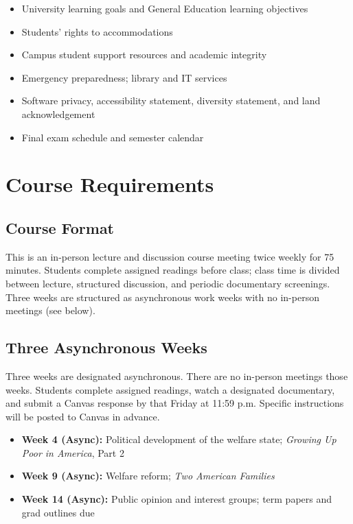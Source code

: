 \documentclass[12pt]{article}
\begin{document}
\begin{itemize}
\item University learning goals and General Education learning objectives
\item Students' rights to accommodations
\item Campus student support resources and academic integrity
\item Emergency preparedness; library and IT services
\item Software privacy, accessibility statement, diversity statement, and land acknowledgement
\item Final exam schedule and semester calendar
\end{itemize}

\section*{Course Requirements}

\subsection*{Course Format}
This is an in-person lecture and discussion course meeting twice weekly for 75 minutes. Students complete assigned readings before class; class time is divided between lecture, structured discussion, and periodic documentary screenings. Three weeks are structured as asynchronous work weeks with no in-person meetings (see below).

\subsection*{Three Asynchronous Weeks}
Three weeks are designated asynchronous. There are no in-person meetings those weeks. Students complete assigned readings, watch a designated documentary, and submit a Canvas response by that Friday at 11:59 p.m. Specific instructions will be posted to Canvas in advance.

\begin{itemize}
    \item \textbf{Week 4 (Async):} Political development of the welfare state; \emph{Growing Up Poor in America}, Part 2
    \item \textbf{Week 9 (Async):} Welfare reform; \emph{Two American Families}
    \item \textbf{Week 14 (Async):} Public opinion and interest groups; term papers and grad outlines due
\end{itemize}
\end{document}
